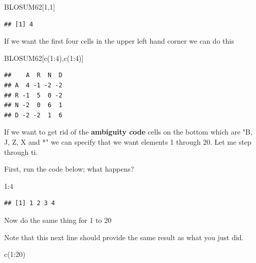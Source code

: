 \documentclass[
]{book}
\newenvironment{Shaded}{\begin{snugshade}}{\end{snugshade}}
\newcommand{\DecValTok}[1]{\textcolor[rgb]{0.00,0.00,0.81}{#1}}
\newcommand{\FunctionTok}[1]{\textcolor[rgb]{0.00,0.00,0.00}{#1}}
\newcommand{\NormalTok}[1]{#1}
\newcommand{\SpecialCharTok}[1]{\textcolor[rgb]{0.00,0.00,0.00}{#1}}
\begin{document}
\begin{Shaded}
\begin{Highlighting}[]
\NormalTok{BLOSUM62[}\DecValTok{1}\NormalTok{,}\DecValTok{1}\NormalTok{]}
\end{Highlighting}
\end{Shaded}

\begin{verbatim}
## [1] 4
\end{verbatim}

If we want the first four cells in the upper left hand corner we can do this

\begin{Shaded}
\begin{Highlighting}[]
\NormalTok{BLOSUM62[}\FunctionTok{c}\NormalTok{(}\DecValTok{1}\SpecialCharTok{:}\DecValTok{4}\NormalTok{),}\FunctionTok{c}\NormalTok{(}\DecValTok{1}\SpecialCharTok{:}\DecValTok{4}\NormalTok{)]}
\end{Highlighting}
\end{Shaded}

\begin{verbatim}
##    A  R  N  D
## A  4 -1 -2 -2
## R -1  5  0 -2
## N -2  0  6  1
## D -2 -2  1  6
\end{verbatim}

If we want to get rid of the \textbf{ambiguity code} cells on the bottom which are "B, J, Z, X and *" we can specify that we want elements 1 through 20. Let me step through ti.

First, run the code below; what happens?

\begin{Shaded}
\begin{Highlighting}[]
\DecValTok{1}\SpecialCharTok{:}\DecValTok{4}
\end{Highlighting}
\end{Shaded}

\begin{verbatim}
## [1] 1 2 3 4
\end{verbatim}

Now do the same thing for 1 to 20

Note that this next line should provide the same result as what you just did.

\begin{Shaded}
\begin{Highlighting}[]
\FunctionTok{c}\NormalTok{(}\DecValTok{1}\SpecialCharTok{:}\DecValTok{20}\NormalTok{)}
\end{Highlighting}
\end{Shaded}
\end{document}
